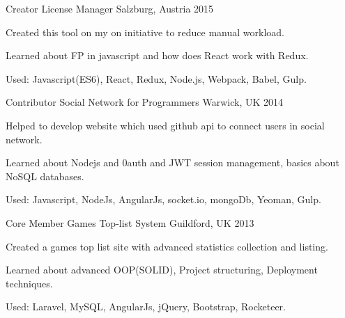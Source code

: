 

\begin{cventries}

  \cventry
    {Creator} %
    {License Manager} %
    {Salzburg, Austria} %
    {2015} %
    {
      \begin{cvitems} %
        \item {Created this tool on my on initiative to reduce manual workload.}
        \item {Learned about FP in javascript and how does React work with Redux.}
        \item {Used: Javascript(ES6), React, Redux, Node.js, Webpack, Babel, Gulp.}
      \end{cvitems}
    }

  \cventry
    {Contributor} %
    {Social Network for Programmers} %
    {Warwick, UK} %
    {2014} %
    {
      \begin{cvitems} %
        \item {Helped to develop website which used github api to connect users in social network.}
        \item {Learned about Nodejs and 0auth and JWT session management, basics about NoSQL databases.}
        \item {Used: Javascript, NodeJs, AngularJs, socket.io, mongoDb, Yeoman, Gulp.}
      \end{cvitems}
    }

  \cventry
    {Core Member} %
    {Games Top-list System} %
    {Guildford, UK} %
    {2013} %
    {
      \begin{cvitems} %
        \item {Created a games top list site with advanced statistics collection and listing.}
        \item {Learned about advanced OOP(SOLID), Project structuring, Deployment techniques.}
        \item {Used: Laravel, MySQL, AngularJs, jQuery, Bootstrap, Rocketeer.}
      \end{cvitems}
    }


\end{cventries}
